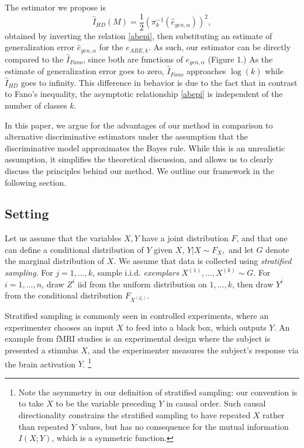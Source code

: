 \documentclass{article}
\begin{document}
The estimator we propose is
\[
\hat{I}_{HD}(M) = \frac{1}{2}(\pi_{k}^{-1}(\hat{e}_{gen, \alpha}))^2,
\]
obtained by inverting the relation \eqref{abepi}, then substituting
an estimate of generalization error $\hat{e}_{gen, \alpha}$ for the $e_{ABE, k}$.  As such,
our estimator can be directly compared to the $\hat{I}_{Fano}$, since
both are functions of $\hat{e}_{gen,\alpha}$ (Figure 1.)
As the estimate of generalization error goes to zero, $\hat{I}_{Fano}$ approaches $\log(k)$
while $\hat{I}_{HD}$ goes to infinity.   This difference in behavior is due to the fact that
in contrast to Fano's inequality, the asymptotic relationship \eqref{abepi} is independent of the
number of classes $k$.

In this paper, we argue for the advantages of our method in comparison to alternative discriminative estimators
under the assumption that the discriminative model approximates the Bayes rule.
While this is an unrealistic assumption, it simplifies the theoretical discussion, and allows us to clearly
discuss the principles behind our method.  We outline our framework in the following section.


\subsection{Setting}

Let us assume that the variables $X, Y$ have a joint distribution $F$,
and that one can define a conditional distribution of $Y$ given $X$,
$Y|X \sim F_X,$ and let $G$ denote the marginal distribution of $X$.
We assume that data is collected using \emph{stratified sampling}.
For $j = 1,\hdots, k$, sample
  i.i.d. \emph{exemplars} $X^{(1)},\hdots, X^{(k)} \sim G$.  For $i =
  1,\hdots, n$, draw $Z^i$ iid from the uniform distribution on
  $1,\hdots, k$, then draw $Y^i$ from the conditional distribution
  $F_{X^{(Z_i)}}$.

Stratified sampling is commonly seen in controlled experiments, where an experimenter
chooses an input $X$ to feed into a black box, which outputs $Y$.  An
example from fMRI studies is an experimental design where the subject
is presented a stimulus $X$, and the experimenter measures the
subject's response via the brain activation $Y$. \footnote{Note the
  asymmetry in our definition of stratified sampling: our convention
  is to take $X$ to be the variable preceding $Y$ in causal order.
  Such causal directionality constrains the stratified sampling to
  have repeated $X$ rather than repeated $Y$ values, but has no
  consequence for the mutual information $I(X; Y)$, which is a
  symmetric function.}
\end{document}
